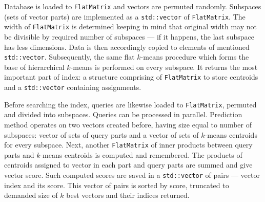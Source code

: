 Database is loaded to \texttt{FlatMatrix} and vectors are permuted randomly.
Subspaces (sets of vector parts) are implemented as a \texttt{std::vector} of \texttt{FlatMatrix}.
The width of \texttt{FlatMatrix} is determined keeping in mind that original width may not be
divisible by required number of subspaces --- if it happens, the last subspace has less dimensions.
Data is then accordingly copied to elements of mentioned \texttt{std::vector}.
Subsequently, the same flat $k$-means procedure which forms the base of hierarchical $k$-means
is performed on every subspace. It returns the most important part of index:
a structure comprising of \texttt{FlatMatrix} to store centroids and a \texttt{std::vector} containing assignments.

Before searching the index, queries are likewise loaded to \texttt{FlatMatrix}, permuted and divided into subspaces.
Queries can be processed in parallel.
Prediction method operates on two vectors created before, having size equal to number of subspaces:
vector of sets of query parts and a vector of sets of $k$-means centroids for every subspace.
Next, another \texttt{FlatMatrix} of inner products between query parts and $k$-means centroids
is computed and remembered.
The products of centroids assigned to vector in each part and query parts are summed and give vector score.
Such computed scores are saved in a \texttt{std::vector} of pairs --- vector index and its score.
This vector of pairs is sorted by score, truncated to demanded size of $k$ best vectors and their indices returned.
